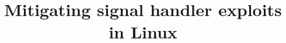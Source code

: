 \documentclass{sig-alternate-05-2015}
\begin{document}






%

\title{Mitigating signal handler exploits in Linux}
%
%
%
%
%
\end{document}
